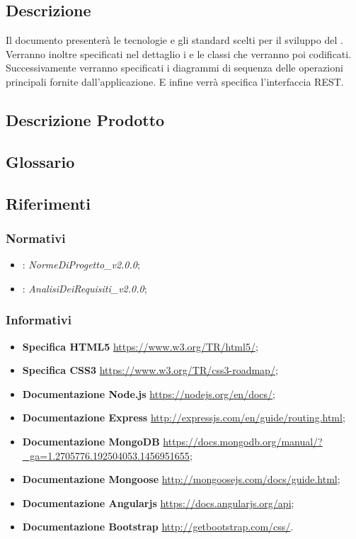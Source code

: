\documentclass[12pt,a4paper]{article}
\begin{document}
\subsection{Descrizione}
Il documento presenterà le tecnologie e gli standard scelti per il sviluppo del . Verranno inoltre specificati nel dettaglio i  e le classi che verranno poi codificati. Successivamente verranno specificati i diagrammi di sequenza delle operazioni principali fornite dall'applicazione. E infine verrà specifica l'interfaccia REST.

\subsection{Descrizione Prodotto}
\descrizioneProdotto

\subsection{Glossario}
\glossarioPrint

\subsection{Riferimenti}

\subsubsection{Normativi}
\begin{itemize}
    \item \NdP{}: \textit{NormeDiProgetto\_v2.0.0};
    \item \AdR{}: \textit{AnalisiDeiRequisiti\_v2.0.0};
\end{itemize}

\subsubsection{Informativi}
\begin{itemize}
    \item \textbf{Specifica HTML5} \url{https://www.w3.org/TR/html5/};
    \item \textbf{Specifica CSS3} \url{https://www.w3.org/TR/css3-roadmap/};
    \item \textbf{Documentazione Node.js} \url{https://nodejs.org/en/docs/};
    \item \textbf{Documentazione Express} \url{http://expressjs.com/en/guide/routing.html};
    \item \textbf{Documentazione MongoDB} \url{https://docs.mongodb.org/manual/?_ga=1.2705776.192504053.1456951655};
    \item \textbf{Documentazione Mongoose} \url{http://mongoosejs.com/docs/guide.html};
    \item \textbf{Documentazione Angularjs} \url{https://docs.angularjs.org/api};
    \item \textbf{Documentazione Bootstrap} \url{http://getbootstrap.com/css/}.
\end{itemize}
\end{document}
